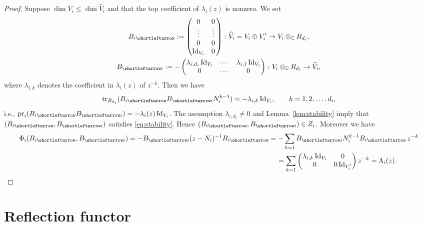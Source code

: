 \documentclass[pdftex]{sigma}
\newcommand{\slar}{\shortleftarrow}
\numberwithin{equation}{section}
\theoremstyle{definition}
\newcommand{\lemref}[1]{Lemma~\ref{#1}}
\newcommand{\C}{\mathbb{C}} %
\newcommand{\Ker}{\operatorname{Ker}}
\newcommand{\rank}{\operatorname{rank}}
\newcommand{\tr}{\operatorname{tr}}
\newcommand{\unit}{\mathrm{Id}}
\newcommand{\prj}{\operatorname{pr}}
\begin{document}
\begin{proof}
Suppose $\dim V_i \leq \dim \widehat{V}_i$
and that the top coef\/f\/icient of $\lambda_i(z)$ is nonzero. We set
\begin{gather*}
B_{i \slar}  := \begin{pmatrix}
0 & 0\, \\ \vdots & \vdots\, \\ 0 & 0\, \\ \unit_{V_i} & 0\,
\end{pmatrix}
\colon \widehat{V}_i = V_i \oplus V'_i \to V_i \otimes_\C R_{d_i}, \\
B_{\slar i}  := - \begin{pmatrix}
\lambda_{i,d_i}\,\unit_{V_i} & \cdots & \lambda_{i,1}\,\unit_{V_i} \\
0 & \cdots & 0
\end{pmatrix}
\colon V_i \otimes_\C R_{d_i} \to \widehat{V}_i,
\end{gather*}
where $\lambda_{i,k}$ denotes the coef\/f\/icient in $\lambda_i(z)$ of $z^{-k}$.
Then we have
\[
\tr_{R_{d_i}}(B_{i \slar}  B_{\slar i} N_i^{k-1})
= -\lambda_{i,k}\,\unit_{V_i}, \qquad k=1,2, \dots ,d_i,
\]
i.e., $\prj_i(B_{i \slar}  B_{\slar i})=-\lambda_i(z)\,\unit_{V_i}$.
The assumption $\lambda_{i,d_i} \neq 0$ and
\lemref{lem:stability} imply that
$(B_{i \slar},B_{\slar i})$ satisf\/ies \eqref{eq:stability}.
Hence $(B_{i \slar},B_{\slar i}) \in Z_i$.
Moreover we have
\begin{gather*}
\Phi_i(B_{i \slar},B_{\slar i})=
-B_{\slar i}(z-N_i)^{-1}B_{i \slar}  =
-\sum_{k=1}B_{\slar i}N_i^{k-1}B_{i \slar}\,z^{-k} \\
\hphantom{\Phi_i(B_{i \slar},B_{\slar i})=
-B_{\slar i}(z-N_i)^{-1}B_{i \slar}}{}
=\sum_{k=1}
\begin{pmatrix}
\lambda_{i,k}\,\unit_{V_i} & 0 \\
0 & 0\,\unit_{V'_i} \end{pmatrix} z^{-k} = \Lambda_i(z).\tag*{\qed}
\end{gather*}
\renewcommand{\qed}{}
\end{proof}

\section{Ref\/lection functor}\label{sec:reflection}
\end{document}
